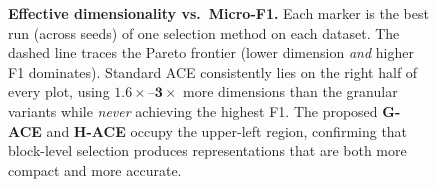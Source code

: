 \begin{figure}[t]

\caption{\textbf{Effective dimensionality vs.\ Micro-F1.} Each marker is the
best run (across seeds) of one selection method on each dataset. The
\textcolor{gray!80}{dashed line} traces the Pareto frontier (lower dimension
\emph{and} higher F1 dominates). Standard ACE consistently lies on the right
half of every plot, using $\mathbf{1.6\times}$--$\mathbf{3\times}$ more
dimensions than the granular variants while \emph{never} achieving the highest
F1. The proposed \textbf{G-ACE} and \textbf{H-ACE} occupy the upper-left
region, confirming that block-level selection produces representations that are
both more compact and more accurate.}
\label{fig:dim_vs_f1}
\end{figure}
